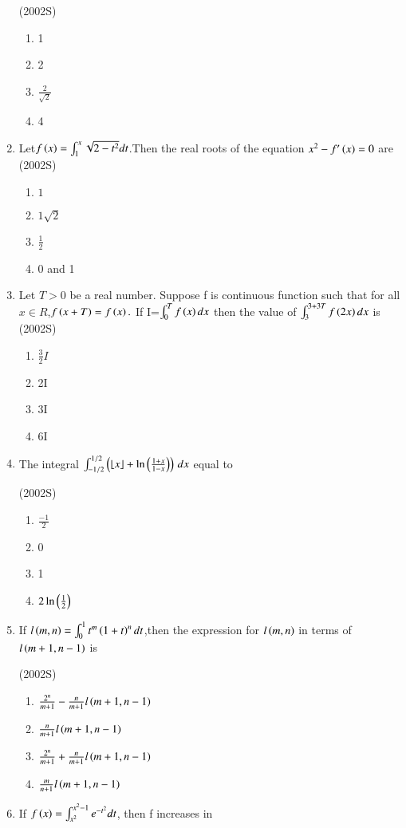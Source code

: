 \documentclass[journal,12pt,twocolumn]{IEEEtran}
\theoremstyle{remark}
\begin{document}
\begin{enumerate}
	\hfill(2002S)
\begin{enumerate}
 \item  1
 \item  2
 \item  $\frac{2}{\sqrt{2}}$
 \item  4
\end{enumerate}
\item Let$f\left(x\right)=\int_{1}^{x}\sqrt{2-{t}^2} dt $.Then the real roots of the equation ${x}^2-f'\left(x\right)=0$ are 
	\hfill(2002S)
\begin{enumerate}
  \item ${1}$
  \item ${1}{\sqrt2}$
  \item $\frac{1}{2}$
   \item 0 and 1
   \end{enumerate}
   \item Let $T>0$ be a real number. Suppose f is continuous function such that for all ${x}\in{R}$,$f\left(x+T\right)=f\left(x\right).$
   If I=$\int_{0}^{T}f\left(x\right)dx$ then the value of $\int_{3}^{3+3T} f\left(2x\right) dx $ is
		\hfill(2002S)
\begin{enumerate}
	\item $\frac{3}{2}{I}$
   \item 2I
   \item 3I
   \item 6I
   \end{enumerate}
   \item The integral $\int_{-1/2}^{1/2} \left( \lfloor x \rfloor + \ln \left( \frac{1+x}{1-x} \right) \right) \, dx$ equal to
   
	   \hfill(2002S)
\begin{enumerate}[label=(\alph*)]
	\item $\frac{-1}{2}$
 \item 0
 \item 1
 \item $2\ln\left(\frac{1}{2}\right)$
 \end{enumerate}



   \item If $l\left(m,n\right)=\int_{0}^{1} t^{m}\left(1+t\right)^{n} dt$,then the expression for $l\left(m,n\right)$ in terms of $l\left(m+1,n-1\right)$ is
   
	   \hfill(2002S)
\begin{enumerate}
 \item $\frac{2^{n}}{m+1} -\frac{n}{m+1}l\left(m+1,n-1\right)$
 \item $\frac{n}{m+1}l\left(m+1,n-1\right)$
 \item$ \frac{2^{n}}{m+1}+\frac{n}{m+1}l\left(m+1,n-1\right)$
 \item $\frac{m}{n+1}l\left(m+1,n-1\right)$
\end{enumerate}
\item If $f\left(x\right)=\int_{x^{2}}^{x^{2}-1} e^{-t^{2}}dt$, then f increases in


\end{enumerate}
\end{document}
